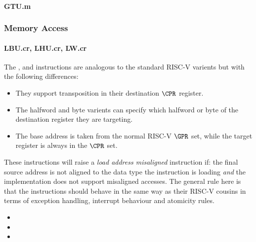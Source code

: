 \paragraph{GTU.m}

\subsubsection{Memory Access}

\paragraph{LBU.cr, LHU.cr, LW.cr}

The ,  and  instructions are analogous to
the standard RISC-V varients but with the following differences:

\begin{itemize}
\item They support transposition in their destination $\CPR$ register.
\item The halfword and byte varients can specify which halfword or byte of
      the destination register they are targeting.
\item The base address is taken from the normal RISC-V $\GPR$ set, while the
      target register is always in the $\CPR$ set.
\end{itemize}

These instructions will raise a {\em load address misaligned} instruction
if: the final source address is not aligned to the data type the instruction
is loading {\em and} the implementation does not support misaligned accesses.
The general rule here is that the  instructions should behave in
the same way as their RISC-V cousins in terms of exception handling,
interrupt behaviour and atomicity rules.

\begin{itemize}
\item {}
\item {}
\item {}
\end{itemize}

